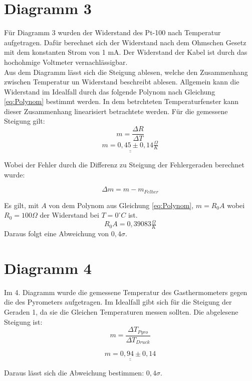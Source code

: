 \section{Diagramm 3}
Für Diagramm 3 wurden der Widerstand des Pt-100 nach Temperatur aufgetragen.
Dafür berechnet sich der Widerstand nach dem Ohmschen Gesetz mit dem konstanten Strom von 1 mA.
Der Widerstand der Kabel ist durch das hochohmige Voltmeter vernachlässigbar.\\

Aus dem Diagramm lässt sich die Steigung ablesen, welche den Zusammenhang zwischen Temperatur un Widerstand beschreibt ablesen.
Allgemein kann die Widerstand im Idealfall durch das folgende Polynom nach Gleichung \ref{eq:Polynom} bestimmt werden.
In dem betrchteten Temperaturfenster kann dieser Zusammenhang linearisiert betrachtete werden.
Für die gemessene Steigung gilt:
\begin{equation}
    m = \frac{\Delta R}{\Delta T}
\end{equation}
\[\underline{\underline{m = 0,45 \pm 0,14 \tfrac{\Omega}{K}}}\]

Wobei der Fehler durch die Differenz zu Steigung der Fehlergeraden berechnet wurde:

\begin{equation}
    \Delta m = m- m_{Felher}
    \label{eq:SteigungFehler}
\end{equation}

Es gilt, mit $A $ von dem Polynom aus Gleichung \ref{eq:Polynom}, $m = R_0 A$ wobei $R_0 = 100 \Omega$ der Widerstand bei $T= 0^\circ C$ ist.
\[ R_0 A = 0,39083 \tfrac{\Omega}{K}\]
Daraus folgt eine Abweichung von $0,4 \sigma$.

\section{Diagramm 4}
Im 4. Diagramm wurde die gemessene Temperatur des Gasthermometers gegen die des Pyrometers aufgetragen.
Im Idealfall gibt sich für die Steigung der Geraden 1, da sie die Gleichen Temperaturen messen sollten.
Die abgelesene Steigung ist:
\begin{equation}
    m = \frac{\Delta T_{Pyro}}{\Delta T_{Druck}}
\end{equation}

\[\underline{\underline{ m = 0,94 \pm 0,14 }}\]

Daraus lässt sich die Abweichung bestimmen: $0,4 \sigma$.